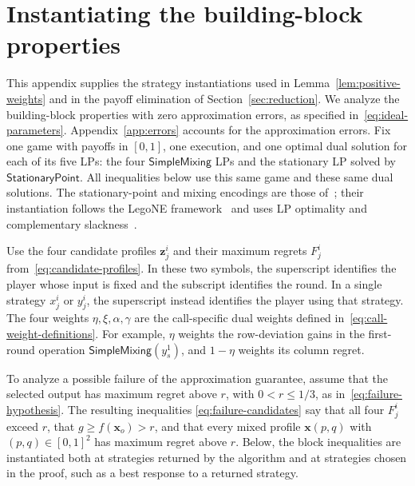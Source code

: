 \documentclass[11pt]{article}
\theoremstyle{remark}
\theoremstyle{plain}
\newcommand{\sm}{\mathsf{SimpleMixing}}
\newcommand{\spoint}{\mathsf{StationaryPoint}}
\begin{document}
\appendix

\section{Instantiating the building-block properties}
\label{app:instantiation}

This appendix supplies the strategy instantiations used in
Lemma~\ref{lem:positive-weights} and in the payoff elimination of
Section~\ref{sec:reduction}. We analyze the building-block properties
with zero approximation errors, as specified in~\eqref{eq:ideal-parameters}.
Appendix~\ref{app:errors} accounts for the approximation errors.
Fix one game with payoffs in $[0,1]$, one execution, and one optimal
dual solution for each of its five LPs: the four $\sm$ LPs and the
stationary LP solved by $\spoint$.
All inequalities below use this same game and these same dual solutions.
The stationary-point and mixing encodings are those
of~\cite{ts2008,tightness2023,automating2025,mixing2025};
their instantiation follows the LegoNE
framework~\cite{computeraided2026,legone2026} and uses LP optimality
and complementary slackness~\cite{boyd2004}.

Use the four candidate profiles $\boldsymbol z_j^i$ and their maximum
regrets $F_j^i$ from~\eqref{eq:candidate-profiles}. In these two symbols,
the superscript identifies the player whose input is fixed and the
subscript identifies the round. In a single strategy $x_j^i$ or $y_j^i$,
the superscript instead identifies the player using that strategy.
The four weights $\eta,\xi,\alpha,\gamma$ are the call-specific
dual weights defined in~\eqref{eq:call-weight-definitions}. For example,
$\eta$ weights the row-deviation gains in the first-round operation
$\sm(y_s^1)$, and $1-\eta$ weights its column regret.

To analyze a possible failure of the approximation guarantee, assume that
the selected output has maximum regret above $r$, with $0<r\le1/3$,
as in~\eqref{eq:failure-hypothesis}. The resulting inequalities
\eqref{eq:failure-candidates} say that all four $F_j^i$ exceed $r$,
that $g\ge f(\boldsymbol x_o)>r$, and that every mixed profile
$\boldsymbol x(p,q)$ with $(p,q)\in[0,1]^2$ has maximum
regret above $r$. Below, the block inequalities are instantiated
both at strategies returned by the algorithm and at strategies
chosen in the proof, such as a best response to a returned strategy.
\end{document}
